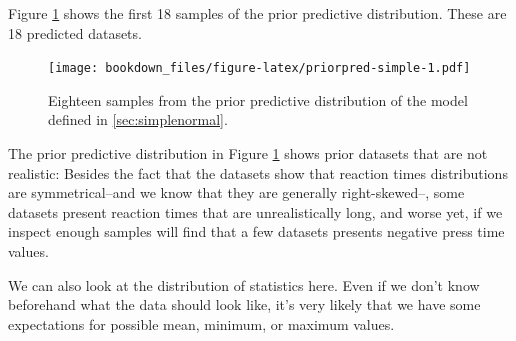 \documentclass[12pt,]{krantz}
\newenvironment{Shaded}{\begin{snugshade}}{\end{snugshade}}
\newcommand{\DataTypeTok}[1]{\textcolor[rgb]{0.13,0.29,0.53}{#1}}
\newcommand{\DecValTok}[1]{\textcolor[rgb]{0.00,0.00,0.81}{#1}}
\newcommand{\KeywordTok}[1]{\textcolor[rgb]{0.13,0.29,0.53}{\textbf{#1}}}
\newcommand{\NormalTok}[1]{#1}
\newcommand{\OperatorTok}[1]{\textcolor[rgb]{0.81,0.36,0.00}{\textbf{#1}}}
\newcommand{\StringTok}[1]{\textcolor[rgb]{0.31,0.60,0.02}{#1}}
\theoremstyle{definition}
\theoremstyle{definition}
\theoremstyle{definition}
\theoremstyle{remark}
\begin{document}
Figure \ref{fig:priorpred-simple} shows the first 18 samples of the prior predictive distribution. These are 18 predicted datasets.



\begin{Shaded}
\end{Shaded}

\begin{figure}
\centering
\texttt{[image: bookdown\_files/figure-latex/priorpred-simple-1.pdf]}
\caption{\label{fig:priorpred-simple}Eighteen samples from the prior predictive distribution of the model defined in \ref{sec:simplenormal}.}
\end{figure}

The prior predictive distribution in Figure \ref{fig:priorpred-simple} shows prior datasets that are not realistic: Besides the fact that the datasets show that reaction times distributions are symmetrical--and we know that they are generally right-skewed--, some datasets present reaction times that are unrealistically long, and worse yet, if we inspect enough samples will find that a few datasets presents negative press time values.

We can also look at the distribution of statistics here. Even if we don't know beforehand what the data should look like, it's very likely that we have some expectations for possible mean, minimum, or maximum values.
\end{document}
